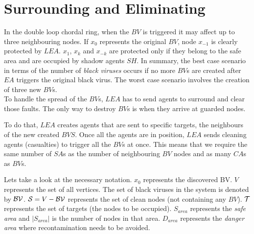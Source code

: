 \section{Surrounding and Eliminating}


In the double loop chordal ring, when the $BV$ is triggered it may affect  up to three neighbouring nodes.
If $x_0$ represents the original $BV$, node $x_{-1}$ is clearly protected by $LEA$. $x_{1} $, $x_{k}$ and $x_{-k}$ are protected only if they belong to the safe area and are occupied by shadow agents $SH$.
In summary, the best case scenario in terms of the number of  {\it black viruses} occurs if no more $BV$s are created after $EA$ triggers the original black virus. The worst case scenario involves the creation of three new $BV$s.  \\
To handle the spread of the $BV$s, $LEA$ has to send agents to surround and clear those faults. The only way to destroy $BV$s is when they arrive at guarded nodes.

To do that, $LEA$ creates agents that are sent to specific targets, the neighbours of the new created $BVS$. Once all the agents are in position,  $LEA$ sends cleaning agents (casualties) to trigger all the $BV$s at once. This means that we require the same number of $SA$s as the number of neighbouring $BV$ nodes and as many $CA$s as $BV$s. 


Lets take a look at the necessary notation.  $x_0$ represents the discovered BV.  $V$ represents the set of all vertices. The set of black viruses in the system is denoted by  ${\cal BV}$.  ${\cal S} = V - {\cal BV}$ represents the set of  clean nodes (not containing any $BV$). ${\cal T}$ represents the set of targets (the nodes to be occupied). $S_{area}$ represents the {\it safe area} and  $\left\vert{S_{area}}\right\vert$ is the number of nodes in that area. $D_{area}$ represents the {\it danger area} where recontamination needs to be avoided.



